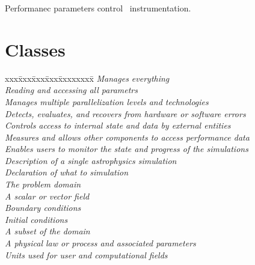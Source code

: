 \documentclass{book}
\begin{document}
Performanec parameters control \lcaperf\ instrumentation.



\chapter{Classes} \label{s:classes}

\begin{tabbing}
xxx\=xxx\=xxx\=xxx\=xxxxxxxx\= \kill
 \>           \>\>\>\> \textit{Manages everything}  \\
 \>\>        \>\>\> \textit{Reading and accessing all parametrs} \\
 \>\>          \>\>\> \textit{Manages multiple parallelization levels and technologies} \\
 \>\>          \>\>\> \textit{Detects, evaluates, and recovers from hardware or software errors} \\
 \>\>            \>\>\> \textit{Controls access to internal state and data by external entities} \\
 \>\>       \>\>\> \textit{Measures and allows other components to access performance data} \\
 \>\>           \>\>\> \textit{Enables users to monitor the state and progress of the simulations} \\
 \>        \>\>\>\> \textit{Description of a single astrophysics simulation} \\
 \>\>           \>\>\> \textit{Declaration of what to simulation} \\
 \>\>\>            \>\> \textit{The problem domain} \\
 \>\>\>             \>\> \textit{A scalar or vector field} \\
 \>\>\>          \>\> \textit{Boundary conditions} \\
 \>\>\>           \>\> \textit{Initial conditions} \\
 \>\>\>\>            \> \textit{A subset of the domain} \\
 \>\>           \>\>\> \textit{A physical law or process and associated parameters} \\
 \>\>\>             \>\> \textit{Units used for user and computational fields} \\

\end{tabbing}
\end{document}
